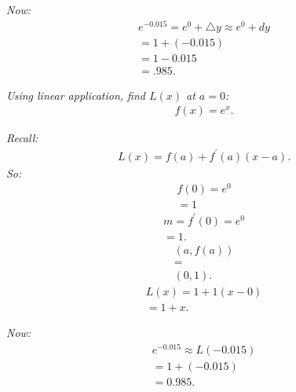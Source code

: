 \documentclass{report}
\begin{document}
    \bigbreak \noindent 
    \textit{Now:}
    \begin{align*}
      e^{-0.015} = e^{0} + \triangle y \approx e^{0} + dy \\
      = 1 + (-0.015) \\
      = 1-0.015 \\
      = .985
    .\end{align*}

    \bigbreak \noindent 
    \textit{Using linear application, find $L(x)$ at $a = 0$:}
    \begin{align*}
      f(x) = e^{x}
    .\end{align*}

    \bigbreak \noindent 
    \textit{Recall:}
    \begin{align*}
      L(x) = f(a) + f^{\prime}(a)(x-a)
    .\end{align*}
    \bigbreak \noindent
    \textit{So:}
    \begin{align*}
      f(0) = e^{0} \\
      = 1
    \end{align*}
    \begin{align*}
      m = f^{\prime}(0) = e^{0} \\
      = 1
    .\end{align*}
    \begin{align*}
      (a,f(a)) \\
      = \\
      (0, 1)
    .\end{align*}
    \begin{align*}
      L(x) = 1 + 1(x- 0) \\ 
      = 1+x
    .\end{align*}

    \bigbreak \noindent 
    \textit{Now: }
    \begin{align*}
      e^{-0.015} \approx L(-0.015) \\
      = 1+(-0.015) \\
      = 0.985
    .\end{align*}







  
\end{document}
